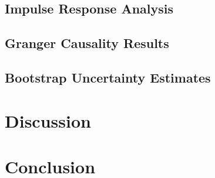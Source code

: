 \documentclass[11pt]{article}
\begin{document}

\subsection{Impulse Response Analysis}

\subsection{Granger Causality Results}

\subsection{Bootstrap Uncertainty Estimates}

\section{Discussion}


\section{Conclusion}
\end{document}
